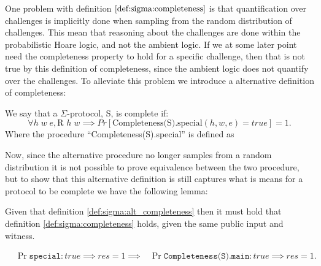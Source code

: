 One problem with definition $\ref{def:sigma:completeness}$ is that
quantification over challenges is implicitly done when sampling from the random
distribution of challenges. This mean that reasoning about the challenges are
done within the probabilistic Hoare logic, and not the ambient logic. If we at
some later point need the completeness property to hold for a specific
challenge, then that is not true by this definition of completeness, since
the ambient logic does not quantify over the challenges. To alleviate this
problem we introduce a alternative definition of completeness:

\begin{definition}
\label{def:sigma:alt_completeness}
  We say that a $\Sigma$-protocol, S, is complete if:
  \begin{equation}
    \label{eq:sigma_completeness}
    \forall h \; w \; e, \text{R } h \; w \implies Pr[\text{Completeness(S).special}(h,w,e) = true] = 1.
  \end{equation}
  Where the procedure ``Completeness(S).special'' is defined as
  
\end{definition}

Now, since the alternative procedure no longer samples from a random
distribution it is not possible to prove equivalence between the two procedure,
but to show that this alternative definition is still captures what is means for
a protocol to be complete we have the following lemma:

\begin{lemma}
  \label{lem:sigma:alt:completeness}
Given that definition \ref{def:sigma:alt_completeness} then it must hold that
definition \ref{def:sigma:completeness} holds, given the same public input and witness.

\begin{align*}
  &\Pr{\texttt{special} : true \implies res} = 1 \implies
    &\Pr{\texttt{Completeness(S).main} : true \implies res} = 1.
\end{align*}
\end{lemma}

